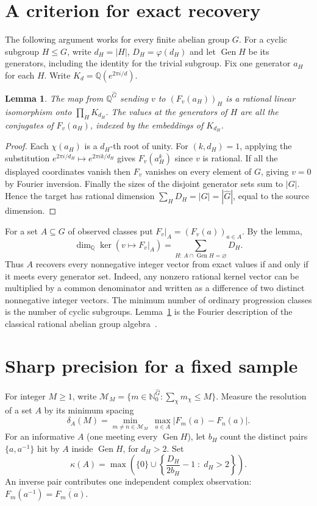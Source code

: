 \documentclass[11pt]{article}
\newtheorem{lemma}[theorem]{Lemma}
\newcommand{\Q}{\mathbb Q}
\newcommand{\N}{\mathbb N_0}
\newcommand{\gen}{\operatorname{Gen}}
\newcommand{\calM}{\mathcal M}
\begin{document}
\newpage
\section{A criterion for exact recovery}
The following argument works for every finite abelian group $G$. For a cyclic subgroup $H\le G$, write $d_H=|H|$, $D_H=\varphi(d_H)$ and let $\gen H$ be its generators, including the identity for the trivial subgroup. Fix one generator $a_H$ for each $H$. Write $K_d=\Q(e^{2\pi i/d})$.

\begin{lemma}\label{lem:blocks}
The map from $\Q^{\widehat G}$ sending $v$ to $(F_v(a_H))_H$ is a rational linear isomorphism onto $\prod_H K_{d_H}$. The values at the generators of $H$ are all the conjugates of $F_v(a_H)$, indexed by the embeddings of $K_{d_H}$.
\end{lemma}
\begin{proof}
Each $\chi(a_H)$ is a $d_H$-th root of unity. For $(k,d_H)=1$, applying the substitution $e^{2\pi i/d_H}\mapsto e^{2\pi i k/d_H}$ gives $F_v(a_H^k)$ since $v$ is rational. If all the displayed coordinates vanish then $F_v$ vanishes on every element of $G$, giving $v=0$ by Fourier inversion. Finally the sizes of the disjoint generator sets sum to $|G|$. Hence the target has rational dimension $\sum_H D_H=|G|=|\widehat G|$, equal to the source dimension.
\end{proof}

For a set $A\subseteq G$ of observed classes put $F_v|_A=(F_v(a))_{a\in A}$. By the lemma,
\begin{equation}
 \dim_{\Q}\ker(v\mapsto F_v|_A)
    =\sum_{H:\,A\cap\gen H=\varnothing}D_H. \label{eq:kernel}
\end{equation}
Thus $A$ recovers every nonnegative integer vector from exact values if and only if it meets every generator set. Indeed, any nonzero rational kernel vector can be multiplied by a common denominator and written as a difference of two distinct nonnegative integer vectors. The minimum number of ordinary progression classes is the number of cyclic subgroups. Lemma~\ref{lem:blocks} is the Fourier description of the classical rational abelian group algebra~\cite{PW,CO}.

\section{Sharp precision for a fixed sample}
For integer $M\ge1$, write $\calM_M=\{m\in\N^{\widehat G}:\sum_\chi m_\chi\le M\}$. Measure the resolution of a set $A$ by its minimum spacing
\[
 \delta_A(M)=\min_{m\ne n\in\calM_M}\ \max_{a\in A}|F_m(a)-F_n(a)|.
\]
For an informative $A$ (one meeting every $\gen H$), let $b_H$ count the distinct pairs $\{a,a^{-1}\}$ hit by $A$ inside $\gen H$, for $d_H>2$. Set
\[
 \kappa(A)=\max\!\left(\{0\}\cup
       \left\{\frac{D_H}{2b_H}-1\;:\; d_H>2\right\}\right).
\]
An inverse pair contributes one independent complex observation: $F_m(a^{-1})=\overline{F_m(a)}$.
\end{document}

